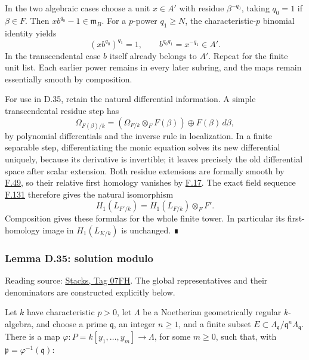 \documentclass[11pt,a4paper,openany]{report}
\begin{document}
In the two algebraic cases choose a unit \(x\in A'\) with residue \(\beta^{-q_0}\), taking \(q_0=1\) if \(\beta\in F\). Then \(xb^{q_0}-1\in\mathfrak m_B\). For a \(p\)-power \(q_1\ge N\), the characteristic-\(p\) binomial identity yields \[
(xb^{q_0})^{q_1}=1,
\qquad b^{q_0q_1}=x^{-q_1}\in A'.
\] In the transcendental case \(b\) itself already belongs to \(A'\). Repeat for the finite unit list. Each earlier power remains in every later subring, and the maps remain essentially smooth by composition.

For use in D.35, retain the natural differential information. A simple transcendental residue step has \[
\Omega_{F(\beta)/k}
=(\Omega_{F/k}\otimes_F F(\beta))\oplus F(\beta)\,d\beta,
\] by polynomial differentials and the inverse rule in localization. In a finite separable step, differentiating the monic equation solves its new differential uniquely, because its derivative is invertible; it leaves precisely the old differential space after scalar extension. Both residue extensions are formally smooth by \hyperref[AG-RG-S05-algebra-lemma-formally-smooth-extensions-easy]{F.49}, so their relative first homology vanishes by \hyperref[AG-RG-S05-algebra-lemma-characterize-formally-smooth-field-extension]{F.17}. The exact field sequence \hyperref[AG-RG-S05-more-algebra-lemma-transitivity-gamma]{F.131} therefore gives the natural isomorphism \[
H_1(L_{F'/k})=H_1(L_{F/k})\otimes_F F'.
\] Composition gives these formulas for the whole finite tower. In particular its first-homology image in \(H_1(L_{K/k})\) is unchanged. ∎

\label{AG-RG-S05-smoothing-lemma-solution-modulo}

\subsubsection{Lemma D.35: solution modulo}\label{AG-RG-S05-lemma-d.35-solution-modulo}

Reading source: \href{https://stacks.math.columbia.edu/tag/07FH}{Stacks, Tag 07FH}. The global representatives and their denominators are constructed explicitly below.

Let \(k\) have characteristic \(p>0\), let \(\Lambda\) be a Noetherian geometrically regular \(k\)-algebra, and choose a prime \(\mathfrak q\), an integer \(n\ge1\), and a finite subset \(E\subset\Lambda_{\mathfrak q}/\mathfrak q^n\Lambda_{\mathfrak q}\). There is a map \(\varphi:P=k[y_1,\ldots,y_m]\to\Lambda\), for some \(m\ge0\), such that, with \(\mathfrak p=\varphi^{-1}(\mathfrak q)\):
\end{document}
